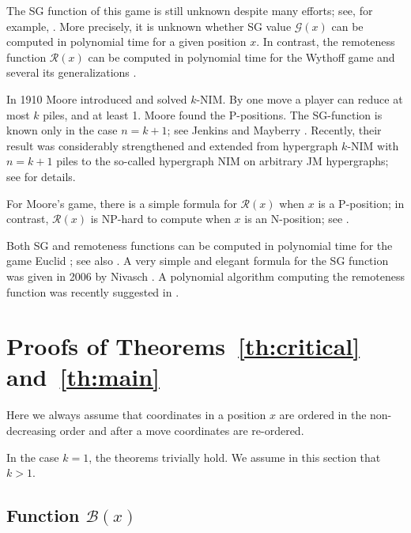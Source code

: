 \documentclass{article}
\theoremstyle{definition}
\def\G{\mathcal{G}}
\def\B{\mathcal{B}}
\def\R{\mathcal{R}}
\begin{document}
The SG function of this game is still unknown 
despite many efforts; 
see, for example, \cite{BF90,Con76,Niv09}. 
More precisely, it is unknown 
whether SG value $\G(x)$  can be computed 
in polynomial time for a given position $x$. 
In contrast, the remoteness function $\R(x)$ 
can be computed in polynomial time 
for the Wythoff game and several its generalizations 
\cite{preprint}. 

In 1910 Moore introduced and solved $k$-NIM. 
By one move a player can reduce 
at most $k$  piles, and at least 1.  
Moore found the P-positions. 
The SG-function is known only in the case 
$n = k+1$; see Jenkins and Mayberry \cite{JM80}. 
Recently, their result was considerably strengthened 
and extended from hypergraph  $k$-NIM with $n = k+1$  piles 
to the so-called 
hypergraph NIM on arbitrary JM hypergraphs; 
see  \cite{BGHM15,BGHMM15,BGHMM17,BGHMM18} 
for details. 

For Moore's game, there is a simple formula 
for $\R(x)$  when  $x$  is a P-position; 
in contrast, $\R(x)$ is NP-hard to compute 
when $x$  is an N-position;
see \cite{preprint}. 

Both SG and remoteness functions 
can be computed in polynomial time 
for the game Euclid \cite{CD69}; 
see also \cite{Fra05,Gur07,Len03,Len04}. 
A very simple and elegant formula  
for the SG function was given 
in 2006 by Nivasch \cite{Niv06}.
A polynomial algorithm computing 
the remoteness function was recently suggested 
in \cite{preprint}.

\section{Proofs of Theorems~\ref{th:critical} and~\ref{th:main}}\label{sec:proofs12}

Here we always assume that coordinates in a position 
$x$ are ordered in the non-decreasing order and after a move coordinates are re-ordered.

In the case $k=1$, the theorems  trivially hold. We assume in this section that $k>1$.

\subsection{Function \boldmath $\B(x)$}
\end{document}
